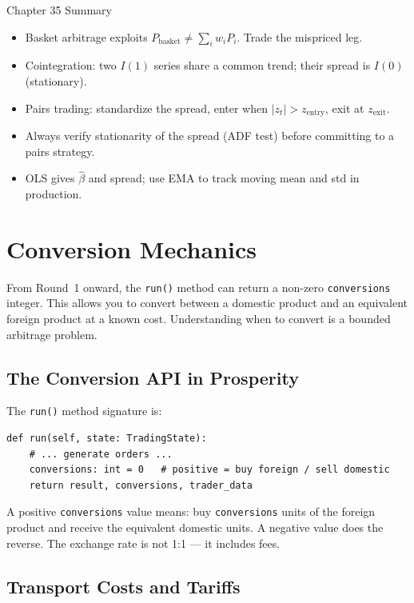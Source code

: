 \documentclass[12pt,a4paper,openany]{report}
\theoremstyle{definition}
\begin{document}
\begin{takeawaybox}{Chapter 35 Summary}
\begin{itemize}
  \item Basket arbitrage exploits $P_{\text{basket}} \ne \sum_i w_i P_i$. Trade the mispriced leg.
  \item Cointegration: two $I(1)$ series share a common trend; their spread is $I(0)$ (stationary).
  \item Pairs trading: standardize the spread, enter when $|z_t| > z_{\text{entry}}$, exit at $z_{\text{exit}}$.
  \item Always verify stationarity of the spread (ADF test) before committing to a pairs strategy.
  \item OLS gives $\hat{\beta}$ and spread; use EMA to track moving mean and std in production.
\end{itemize}
\end{takeawaybox}


\chapter{Conversion Mechanics}

From Round~1 onward, the \texttt{run()} method can return a non-zero \texttt{conversions} integer. This allows you to convert between a domestic product and an equivalent foreign product at a known cost. Understanding when to convert is a bounded arbitrage problem.

\section{The Conversion API in Prosperity}

The \texttt{run()} method signature is:
\begin{lstlisting}
def run(self, state: TradingState):
    # ... generate orders ...
    conversions: int = 0   # positive = buy foreign / sell domestic
    return result, conversions, trader_data
\end{lstlisting}

A positive \texttt{conversions} value means: buy \texttt{conversions} units of the foreign product and receive the equivalent domestic units. A negative value does the reverse. The exchange rate is not 1:1 — it includes fees.

\section{Transport Costs and Tariffs}
\end{document}
